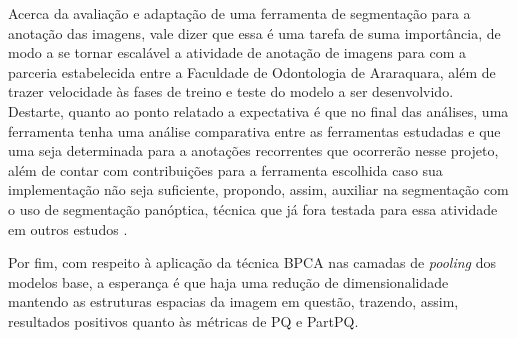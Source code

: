 Acerca da avaliação e adaptação de uma ferramenta de segmentação para a anotação das imagens, vale dizer que essa é uma tarefa de suma importância, de modo a se tornar escalável a atividade de anotação de imagens para com a parceria estabelecida entre a Faculdade de Odontologia de Araraquara, além de trazer velocidade às fases de treino e teste do modelo a ser desenvolvido. Destarte, quanto ao ponto relatado a expectativa é que no final das análises, uma ferramenta tenha uma análise comparativa entre as ferramentas estudadas e que uma seja determinada para a anotações recorrentes que ocorrerão nesse projeto, além de contar com contribuições para a ferramenta escolhida caso sua implementação não seja suficiente, propondo, assim, auxiliar na segmentação com o uso de segmentação panóptica, técnica que já fora testada para essa atividade em outros estudos \cite{Elharrouss2021, Jasper2020}.

Por fim, com respeito à aplicação da técnica BPCA nas camadas de \textit{pooling} dos modelos base, a esperança é que haja uma redução de dimensionalidade mantendo as estruturas espacias da imagem em questão, trazendo, assim, resultados positivos quanto às métricas de PQ e PartPQ.